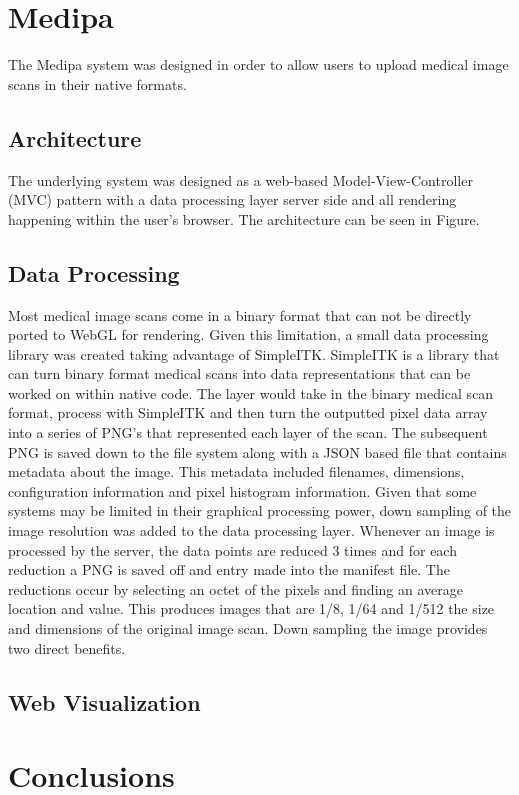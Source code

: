 \documentclass{acm_proc_article-sp}
\begin{document}
\section{Medipa}
The Medipa system was designed in order to allow users to upload medical image scans in their native formats.

\subsection{Architecture}
The underlying system was designed as a web-based Model-View-Controller (MVC) pattern with a data processing layer server side and all rendering happening within the user's browser.  The architecture can be seen in Figure.

\subsection{Data Processing}
Most medical image scans come in a binary format that can not be directly ported to WebGL for rendering.  Given this limitation, a small data processing library was created taking advantage of SimpleITK.  SimpleITK is a library that can turn binary format medical scans into data representations that can be worked on within native code.  The layer would take in the binary medical scan format, process with SimpleITK and then turn the outputted pixel data array into a series of PNG's that represented each layer of the scan.  The subsequent PNG is saved down to the file system along with a JSON based file that contains metadata about the image.  This metadata included filenames, dimensions, configuration information and pixel histogram information.
        Given that some systems may be limited in their graphical processing power, down sampling of the image resolution was added to the data processing layer.  Whenever an image is processed by the server, the data points are reduced 3 times and for each reduction a PNG is saved off and entry made into the manifest file.  The reductions occur by selecting an octet of the pixels and finding an average location and value.  This produces images that are 1/8, 1/64 and 1/512 the size and dimensions of the original image scan.
        Down sampling the image provides two direct benefits.


\subsection{Web Visualization}

\section{Conclusions}
\end{document}
